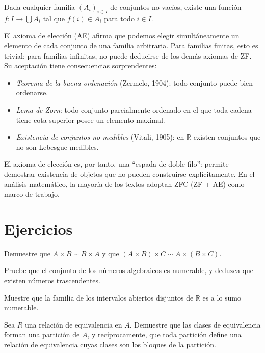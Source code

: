 \begin{axiom}
Dada cualquier familia $(A_i)_{i\in I}$ de conjuntos no vacíos, existe una función $f\colon I\to\bigcup A_i$ tal que $f(i)\in A_i$ para todo $i\in I$.
\end{axiom}

El axioma de elección (AE) afirma que podemos elegir simultáneamente un elemento de cada conjunto de una familia arbitraria. Para familias finitas, esto es trivial; para familias infinitas, no puede deducirse de los demás axiomas de ZF. Su aceptación tiene consecuencias sorprendentes:

\begin{itemize}
  \item \emph{Teorema de la buena ordenación} (Zermelo, 1904): todo conjunto puede bien ordenarse.
  \item \emph{Lema de Zorn}: todo conjunto parcialmente ordenado en el que toda cadena tiene cota superior posee un elemento maximal.
  \item \emph{Existencia de conjuntos no medibles} (Vitali, 1905): en $\mathbb{R}$ existen conjuntos que no son Lebesgue-medibles.
\end{itemize}

El axioma de elección es, por tanto, una ``espada de doble filo'': permite demostrar existencia de objetos que no pueden construirse explícitamente. En el análisis matemático, la mayoría de los textos adoptan ZFC (ZF + AE) como marco de trabajo.

\section{Ejercicios}

\begin{exercise}
Demuestre que $A\times B\sim B\times A$ y que $(A\times B)\times C\sim A\times(B\times C)$.
\end{exercise}

\begin{exercise}
Pruebe que el conjunto de los números algebraicos es numerable, y deduzca que existen números trascendentes.
\end{exercise}

\begin{exercise}
Muestre que la familia de los intervalos abiertos disjuntos de $\mathbb{R}$ es a lo sumo numerable.
\end{exercise}

\begin{exercise}
Sea $R$ una relación de equivalencia en $A$. Demuestre que las clases de equivalencia forman una partición de $A$, y recíprocamente, que toda partición define una relación de equivalencia cuyas clases son los bloques de la partición.
\end{exercise}

